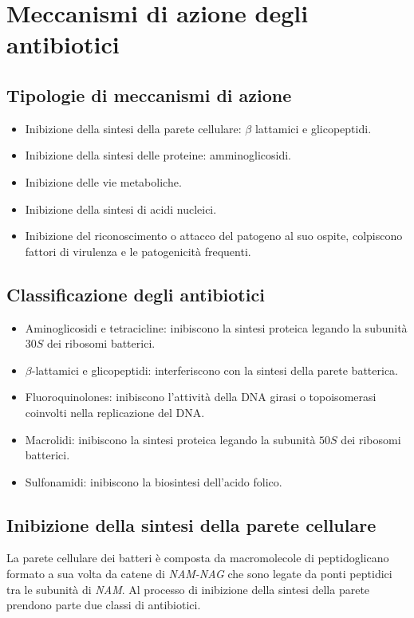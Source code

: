 \section{Meccanismi di azione degli antibiotici}

	\subsection{Tipologie di meccanismi di azione}
	\begin{multicols}{2}
		\begin{itemize}
    			\item Inibizione della sintesi della parete cellulare: $\beta$ lattamici e glicopeptidi.
    			\item Inibizione della sintesi delle proteine: amminoglicosidi.
    			\item Inibizione delle vie metaboliche.
    			\item Inibizione della sintesi di acidi nucleici.
    			\item Inibizione del riconoscimento o attacco del patogeno al suo ospite, colpiscono fattori di virulenza e le patogenicità frequenti. 
		\end{itemize}
	\end{multicols}

	\subsection{Classificazione degli antibiotici}
	\begin{multicols}{2}
		\begin{itemize}
    			\item Aminoglicosidi e tetracicline: inibiscono la sintesi proteica legando la subunità $30S$ dei ribosomi batterici. 
    			\item $\beta$-lattamici e glicopeptidi:  interferiscono con la sintesi della parete batterica.
    			\item Fluoroquinolones: inibiscono l'attività della DNA girasi o topoisomerasi coinvolti nella replicazione del DNA.
    			\item Macrolidi: inibiscono la sintesi proteica legando la subunità $50S$ dei ribosomi batterici.
    			\item Sulfonamidi: inibiscono la biosintesi dell'acido folico.
		\end{itemize}
	\end{multicols}

	\subsection{Inibizione della sintesi della parete cellulare}
	La parete cellulare dei batteri è composta da macromolecole di peptidoglicano formato a sua volta da catene di \emph{NAM-NAG} che sono legate da ponti peptidici tra le subunità di \emph{NAM}.
	Al processo di inibizione della sintesi della parete prendono parte due classi di antibiotici.
	
